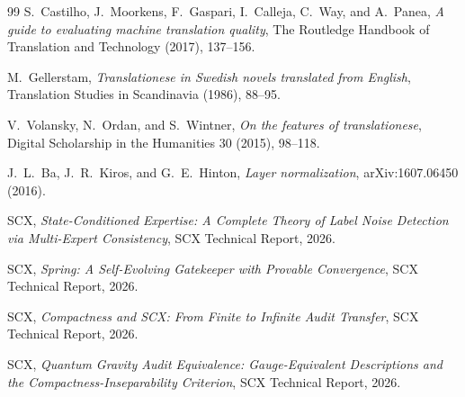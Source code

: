 \documentclass[12pt,a4paper]{article}
\theoremstyle{remark}
\begin{document}
\begin{thebibliography}{99}
S.~Castilho, J.~Moorkens, F.~Gaspari, I.~Calleja, C.~Way,
  and A.~Panea,
\emph{A guide to evaluating machine translation quality},
The Routledge Handbook of Translation and Technology (2017), 137--156.

M.~Gellerstam,
\emph{Translationese in Swedish novels translated from English},
Translation Studies in Scandinavia (1986), 88--95.

V.~Volansky, N.~Ordan, and S.~Wintner,
\emph{On the features of translationese},
Digital Scholarship in the Humanities 30 (2015), 98--118.

J.~L.~Ba, J.~R.~Kiros, and G.~E.~Hinton,
\emph{Layer normalization},
arXiv:1607.06450 (2016).

SCX,
\emph{State-Conditioned Expertise: A Complete Theory of Label Noise
  Detection via Multi-Expert Consistency},
SCX Technical Report, 2026.

SCX,
\emph{Spring: A Self-Evolving Gatekeeper with Provable Convergence},
SCX Technical Report, 2026.

SCX,
\emph{Compactness and SCX: From Finite to Infinite Audit Transfer},
SCX Technical Report, 2026.

SCX,
\emph{Quantum Gravity Audit Equivalence: Gauge-Equivalent Descriptions
  and the Compactness-Inseparability Criterion},
SCX Technical Report, 2026.

\end{thebibliography}
\end{document}
